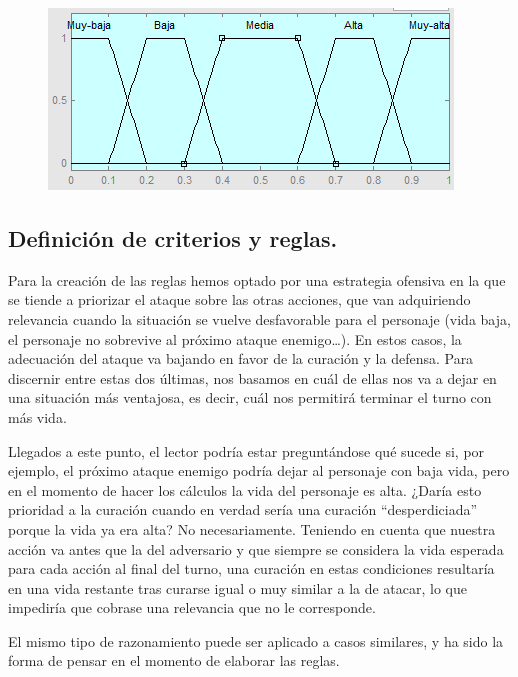 \begin{figure}[H]
	\centering
	\begin{minipage}{.5\textwidth}
		\centering
		\includegraphics[scale=0.67]{images/variables/salida.png}
	\end{minipage}
\end{figure}

\subsection{Definición de criterios y reglas.}
Para la creación de las reglas hemos optado por una estrategia ofensiva en la que se tiende a priorizar el ataque sobre las otras acciones, que van adquiriendo relevancia cuando la situación se vuelve desfavorable para el personaje (vida baja, el personaje no sobrevive al próximo ataque enemigo…). En estos casos, la adecuación del ataque va bajando en favor de la curación y la defensa. Para discernir entre estas dos últimas, nos basamos en cuál de ellas nos va a dejar en una situación más ventajosa, es decir, cuál nos permitirá terminar el turno con más vida.

Llegados a este punto, el lector podría estar preguntándose qué sucede si, por ejemplo, el próximo ataque enemigo podría dejar al personaje con baja vida, pero en el momento de hacer los cálculos la vida del personaje es alta. ¿Daría esto prioridad a la curación cuando en verdad sería una curación ``desperdiciada'' porque la vida ya era alta? No necesariamente. Teniendo en cuenta que nuestra acción va antes que la del adversario y que siempre se considera la vida esperada para cada acción al final del turno, una curación en estas condiciones resultaría en una vida restante tras curarse igual o muy similar a la de atacar, lo que impediría que cobrase una relevancia que no le corresponde.

El mismo tipo de razonamiento puede ser aplicado a casos similares, y ha sido la forma de pensar en el momento de elaborar las reglas.

